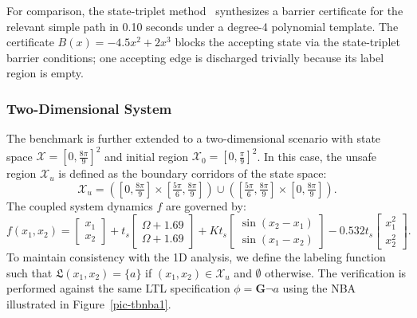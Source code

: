 For comparison, the state-triplet method~\cite{wongpiromsarn2015automata} synthesizes a barrier certificate for the relevant simple path in 0.10 seconds under a degree-4 polynomial template. The certificate $B(x)=-4.5x^2+2x^3$ blocks the accepting state via the state-triplet barrier conditions; one accepting edge is discharged trivially because its label region is empty.

\subsubsection{Two-Dimensional System}

The benchmark is further extended to a two-dimensional scenario with state space $\mathcal{X} = [0, \frac{8\pi}{9}]^2$ and initial region $\mathcal{X}_0 = [0, \frac{\pi}{9}]^2$. In this case, the unsafe region $\mathcal{X}_u$ is defined as the boundary corridors of the state space:
\begin{equation}
\mathcal{X}_u = \left([0, \tfrac{8\pi}{9}] \times [\tfrac{5\pi}{6}, \tfrac{8\pi}{9}]\right) \cup \left([\tfrac{5\pi}{6}, \tfrac{8\pi}{9}] \times [0, \tfrac{8\pi}{9}]\right).
\end{equation}
The coupled system dynamics $f$ are governed by:
\begin{equation}
f(x_1, x_2) =
\begin{bmatrix} x_1 \\ x_2 \end{bmatrix}
+ t_s
\begin{bmatrix} \Omega + 1.69 \\ \Omega + 1.69 \end{bmatrix}
+ K t_s
\begin{bmatrix} \sin(x_2 - x_1) \\ \sin(x_1 - x_2) \end{bmatrix}
- 0.532 t_s
\begin{bmatrix} x_1^2 \\ x_2^2 \end{bmatrix}.
\end{equation}
To maintain consistency with the 1D analysis, we define the labeling function such that $\mathfrak{L}(x_1, x_2) = \{a\}$ if $(x_1, x_2) \in \mathcal{X}_u$ and $\emptyset$ otherwise. The verification is performed against the same LTL specification $\phi = \mathbf{G}\neg a$ using the NBA illustrated in Figure~\ref{pic-tbnba1}.


